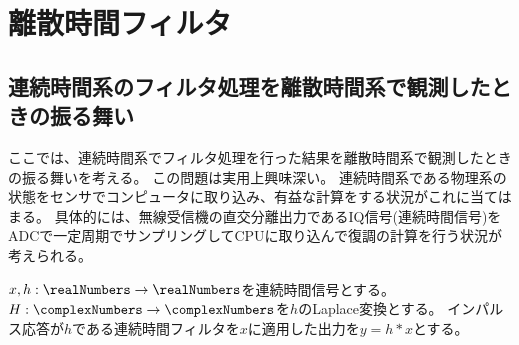 \chapter{離散時間フィルタ}
    \section{連続時間系のフィルタ処理を離散時間系で観測したときの振る舞い}
        ここでは、連続時間系でフィルタ処理を行った結果を離散時間系で観測したときの振る舞いを考える。
        この問題は実用上興味深い。
        連続時間系である物理系の状態をセンサでコンピュータに取り込み、有益な計算をする状況がこれに当てはまる。
        具体的には、無線受信機の直交分離出力であるIQ信号(連続時間信号)をADCで一定周期でサンプリングしてCPUに取り込んで復調の計算を行う状況が考えられる。
        \begin{shadebox}
            $x,h:\realNumbers\to\realNumbers$を連続時間信号とする。
            $H:\complexNumbers\to\complexNumbers$を$h$のLaplace変換とする。
            インパルス応答が$h$である連続時間フィルタを$x$に適用した出力を$y=h*x$とする。
        \end{shadebox}